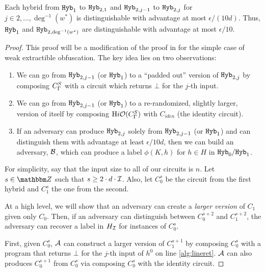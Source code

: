 \begin{lemma}
	\label{lemma:hybB}
	Each hybrid from $\texttt{Hyb}_1$ to $\texttt{Hyb}_{2, 1}$ and $\texttt{Hyb}_{2, j - 1}$ to $\texttt{Hyb}_{2, j}$ for $j \in 2, \dots, \deg^{-1}(w^*)$
	is distinguishable with advantage at most $\epsilon / (10d)$. Thus, $\texttt{Hyb}_1$ and $\texttt{Hyb}_{2, \deg^{-1}(w^*)}$ are distinguishable with advantage at most $\epsilon / 10$.
	\begin{proof}
		This proof will be a modification of the proof in \cite{ishai2015public} for the simple case of weak extractible obfuscation.
		The key idea lies on two observations:
		\begin{enumerate}[labelsep=0.1em]
			\item We can go from $\texttt{Hyb}_{2, j - 1}$ (or $\texttt{Hyb}_1$) to a ``padded out'' version of $\texttt{Hyb}_{2, j}$ by 
			composing ${C_\Gamma^S}$ with a circuit which returns $\bot$ for the $j$-th input.
			\item We can go from $\texttt{Hyb}_{2, j - 1}$ (or $\texttt{Hyb}_1$) to a re-randomized, slightly larger, version of itself by composing $\text{H}i\mathcal{O}({C_\Gamma^S})$ with $C_{iden}$ (the identity circuit).
			\item If an adversary can produce $\texttt{Hyb}_{2, j}$ solely from $\texttt{Hyb}_{2, j - 1}$ (or $\texttt{Hyb}_1$) and can distinguish them with advantage at least $\epsilon / 10d$,
			then we can build an adversary, $\mathcal{B}$, which can produce a label $\phi(K, h)$ for $h \in H$ in $\texttt{Hyb}_0/ \texttt{Hyb}_1$.
		\end{enumerate}

		For simplicity, say that the input size to all of our circuits is $n$. Let $s \in \Z$ such that $s \geq 2 \cdot d \cdot \mathcal{I}$.
		Also, let $C_0^s$ be the circuit from the first hybrid and $C_1^s$ the one from the second.

		At a high level, we will show that an adversary can create a \emph{larger version} of $C_1$ given only $C_0$. Then, 
		if an adversary can distinguish between $C_0^{s + 2}$ and $C_1^{s + 2}$, the adversary can recover a label in $H_{\mathcal{I}}$
		for instances of $C_0^s$.

		First, given $C_0^s$, $\mathcal{A}$ can construct a larger version of $C_1^{s + 1}$ by 
		composing $C_0^s$ with a program that returns $\bot$ for the $j$-th input of $h^0$ on line \ref{alg:lineret}.
		$\mathcal{A}$ can also produces $C_0^{s + 1}$ from $C_0^s$ via composing $C_0^s$ with the identity circuit.


\end{proof}
\end{lemma}
